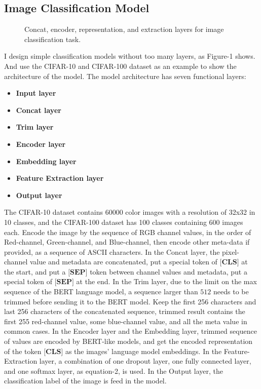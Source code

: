 \documentclass[review]{cvpr}
\begin{document}
\subsection{Image Classification Model}

\begin{figure*}
\begin{center}
\end{center}
   \caption{Concat, encoder, representation, and extraction layers for image classification task.}
\label{fig:short}
\end{figure*}

I design simple classification models without too many layers, as Figure-1 shows.
And use the CIFAR-10 and CIFAR-100 dataset as an example to show the architecture of the model.
The model architecture has seven functional layers:

\begin{itemize}
\item {\bf Input layer}
\item {\bf Concat layer}
\item {\bf Trim layer}
\item {\bf Encoder layer}
\item {\bf Embedding layer}
\item {\bf Feature Extraction layer}
\item {\bf Output layer}
\end{itemize}

\par The CIFAR-10 dataset contains 60000 color images with a resolution of 32x32 in 10 classes, and the CIFAR-100 dataset has 100 classes containing 600 images each.
Encode the image by the sequence of RGB channel values, in the order of Red-channel, Green-channel, and Blue-channel,
then encode other meta-data if provided, as a sequence of ASCII characters.
In the Concat layer, the pixel-channel value and metadata are concatenated, put a special token of $\textbf{[CLS]}$ at the start,
and put a $\textbf{[SEP]}$ token between channel values and metadata, put a special token of $\textbf{[SEP]}$ at the end.
In the Trim layer, due to the limit on the max sequence of the BERT language model, a sequence larger than $512$ needs to be trimmed before sending it to the BERT model.
Keep the first 256 characters and last 256 characters of the concatenated sequence, trimmed result contains the first 255 red-channel value,
some blue-channel value, and all the meta value in common cases.
In the Encoder layer and the Embedding layer, trimmed sequence of values are encoded by BERT-like models,
and get the encoded representation of the token $\textbf{[CLS]}$ as the images' language model embeddings.
In the Feature-Extraction layer, a combination of one dropout layer, one fully connected layer, and one softmax layer, as equation-2, is used.
In the Output layer, the classification label of the image is feed in the model.
\end{document}
